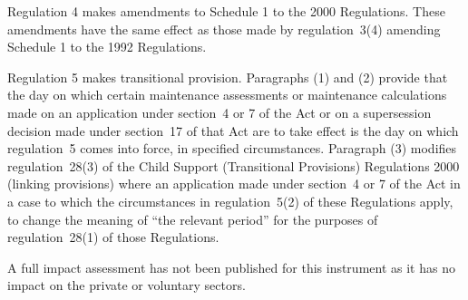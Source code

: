 \documentclass[12pt,a4paper]{article}
\begin{document}
Regulation 4 makes amendments to Schedule 1 to the 2000 Regulations. These amendments have the same effect as those made by regulation~3(4) amending Schedule 1 to the 1992 Regulations.

Regulation 5 makes transitional provision. Paragraphs (1) and (2) provide that the day on which certain maintenance assessments or maintenance calculations made on an application under section~4 or 7 of the Act or on a supersession decision made under section~17 of that Act are to take effect is the day on which regulation~5 comes into force, in specified circumstances. Paragraph (3) modifies regulation~28(3) of the Child Support (Transitional Provisions) Regulations 2000 (linking provisions) where an application made under section~4 or 7 of the Act in a case to which the circumstances in regulation~5(2) of these Regulations apply, to change the meaning of “the relevant period” for the purposes of regulation~28(1) of those Regulations.

A full impact assessment has not been published for this instrument as it has no impact on the private or voluntary sectors. 
\end{document}
